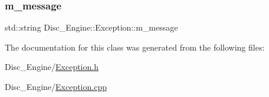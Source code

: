 \subsubsection{\texorpdfstring{m\+\_\+message}{m\_message}}
{\footnotesize\ttfamily std\+::string Disc\+\_\+\+Engine\+::\+Exception\+::m\+\_\+message\hspace{0.3cm}{\ttfamily [private]}}



The documentation for this class was generated from the following files\+:\begin{DoxyCompactItemize}
\item 
Disc\+\_\+\+Engine/\mbox{\hyperlink{_exception_8h}{Exception.\+h}}\item 
Disc\+\_\+\+Engine/\mbox{\hyperlink{_exception_8cpp}{Exception.\+cpp}}\end{DoxyCompactItemize}
